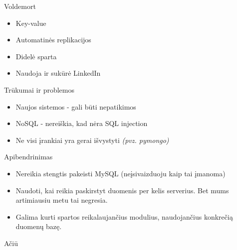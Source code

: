 \documentclass[12pt,a4paper]{beamer}
\begin{document}
\begin{frame}{Voldemort}
	\begin{itemize}
	\item Key-value
	\item Automatinės replikacijos
	\item Didelė sparta
	\item Naudoja ir sukūrė LinkedIn
	\end{itemize}
\end{frame}



\begin{frame}{Trūkumai ir problemos}
	\begin{itemize}
	\item Naujos sistemos - gali būti nepatikimos
	\item NoSQL - nereiškia, kad nėra SQL injection
	\item Ne visi įrankiai yra gerai išvystyti \textit{(pvz. pymongo)}
	\end{itemize}
\end{frame}



\begin{frame}{Apibendrinimas}
	\begin{itemize}
	\item Nereikia stengtis pakeisti MySQL (neįsivaizduoju kaip tai įmanoma)
	\item Naudoti, kai reikia paskirstyt duomenis per kelis serverius. Bet mums artimiausiu metu tai negresia.
	\item Galima kurti spartos reikalaujančius modulius, naudojančius konkrečią duomenų bazę.
	\end{itemize}
\end{frame}

\begin{frame}
	\begin{center}
	Ačiū
	\end{center}
\end{frame}
\end{document}
